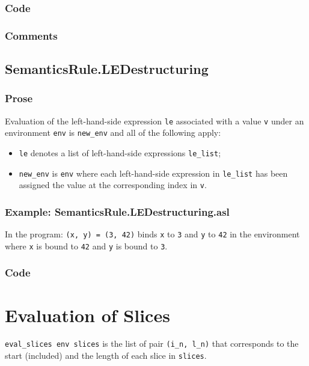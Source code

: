 \documentclass{book}
\begin{document}
  \subsection{Code}

  \subsection{Comments}

\section{SemanticsRule.LEDestructuring \label{sec:SemanticsRule.LEDestructuring}}

    \subsection{Prose}
    Evaluation of the left-hand-side expression \texttt{le} associated with a
value \texttt{v} under an environment \texttt{env} is \texttt{new\_env} and all
of the following apply:
    \begin{itemize}
    \item \texttt{le} denotes a list of left-hand-side expressions \texttt{le\_list};
    \item \texttt{new\_env} is \texttt{env} where each left-hand-side expression in \texttt{le\_list} has
      been assigned the value at the corresponding index in \texttt{v}.
    \end{itemize}

    \subsection{Example: SemanticsRule.LEDestructuring.asl}
    In the program:
    \texttt{(x, y) = (3, 42)} binds \texttt{x} to \texttt{3} and \texttt{y} to \texttt{42} in the environment where \texttt{x} is bound to \texttt{42} and \texttt{y} is bound to \texttt{3}.

  \subsection{Code}

\chapter{Evaluation of Slices \label{chap:eval_slices}}
\texttt{eval\_slices env slices} is the list of pair \texttt{(i\_n, l\_n)} that
corresponds to the start (included) and the length of each slice in
\texttt{slices}.
\end{document}
